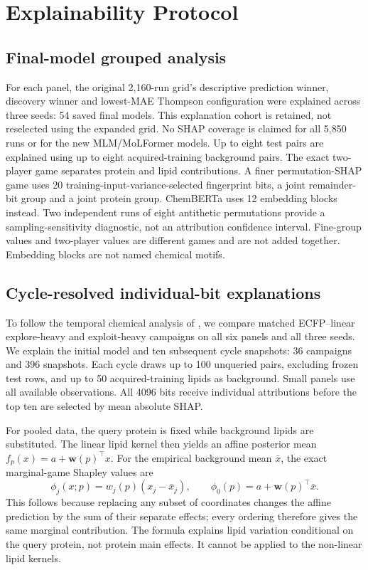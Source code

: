 \documentclass[wcp]{jmlr}
\begin{document}
\section{Explainability Protocol}
\subsection{Final-model grouped analysis}
For each panel, the original 2,160-run grid's descriptive prediction winner,
discovery winner and lowest-MAE Thompson configuration were explained across
three seeds: 54 saved final models. This explanation cohort is retained,
not reselected using the expanded grid. No SHAP coverage is claimed for all
5,850 runs or for the new MLM/MoLFormer models. Up to eight test pairs are explained using up to
eight acquired-training background pairs. The exact two-player game
separates protein and lipid contributions. A finer permutation-SHAP game
uses 20 training-input-variance-selected fingerprint bits, a joint
remainder-bit group and a joint protein group. ChemBERTa uses 12 embedding
blocks instead. Two independent runs of eight antithetic permutations
provide a sampling-sensitivity diagnostic, not an attribution confidence
interval. Fine-group values and two-player values are different games and
are not added together. Embedding blocks are not named chemical motifs.

\subsection{Cycle-resolved individual-bit explanations}
To follow the temporal chemical analysis of \citet{srivastava2026}, we
compare matched ECFP--linear explore-heavy and exploit-heavy campaigns
on all six panels and all three seeds. We explain the initial model and
ten subsequent cycle snapshots: 36 campaigns and 396 snapshots. Each
cycle draws up to 100 unqueried pairs, excluding frozen test rows, and
up to 50 acquired-training lipids as background. Small panels use all
available observations. All 4096 bits receive individual attributions
before the top ten are selected by mean absolute SHAP.

For pooled data, the query protein is fixed while background lipids are
substituted. The linear lipid kernel then yields an affine posterior
mean $f_p(x)=a+\boldsymbol w(p)^\top x$. For the empirical background
mean $\bar x$, the exact marginal-game Shapley values are
\begin{equation}
\phi_j(x;p)=w_j(p)(x_j-\bar x_j),\qquad
\phi_0(p)=a+\boldsymbol w(p)^\top\bar x.
\label{eq:shap}
\end{equation}
This follows because replacing any subset of coordinates changes the
affine prediction by the sum of their separate effects; every ordering
therefore gives the same marginal contribution. The formula explains
lipid variation conditional on the query protein, not protein main effects.
It cannot be applied to the non-linear lipid kernels.
\end{document}
